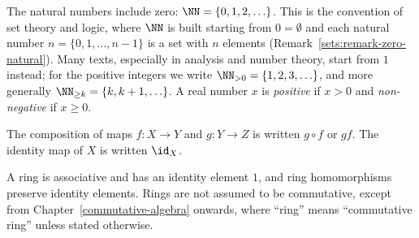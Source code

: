 \begin{notation}\label{introduction:notation-numbers}
The natural numbers include zero: $\NN = \{0, 1, 2, \ldots\}$. This is the
convention of set theory and logic, where $\NN$ is built starting from
$0 = \emptyset$ and each natural number $n = \{0, 1, \ldots, n - 1\}$ is a set with
$n$ elements (Remark~\ref{sets:remark-zero-natural}). Many texts, especially in
analysis and number theory, start from $1$ instead; for the positive integers we
write $\NN_{>0} = \{1, 2, 3, \ldots\}$, and more generally
$\NN_{\geq k} = \{k, k + 1, \ldots\}$. A real number $x$ is \emph{positive} if
$x > 0$ and \emph{non-negative} if $x \geq 0$.
\end{notation}

\begin{notation}\label{introduction:notation-maps}
The composition of maps $f \colon X \to Y$ and $g \colon Y \to Z$ is written
$g \circ f$ or $gf$. The identity map of $X$ is written $\id_X$.
\end{notation}

\begin{notation}\label{introduction:notation-rings}
A ring is associative and has an identity element $1$, and ring homomorphisms
preserve identity elements. Rings are not assumed to be commutative, except
from Chapter~\ref{commutative-algebra} onwards, where ``ring'' means
``commutative ring'' unless stated otherwise.
\end{notation}
